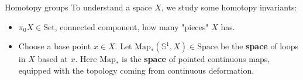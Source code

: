 \documentclass[12pt]{beamer}
\begin{document}
\begin{frame}{Homotopy groups}
To understand a space $X$, we study some homotopy invariants:
\pause
\begin{itemize}
  \item $\pi_0 X \in \mathrm{Set} $, connected component, how many "pieces" $X$ has. 
    \pause
  \item Choose a base point $x\in X$. Let $\mathrm{Map}_*(\mathbb{S}^1,X)\in \mathrm{Space}$ be the \textbf{space} of loops in $X$ based at $x$. Here $\mathrm{Map}_*$ is the \textbf{space} of pointed continuous maps, equipped with the topology coming from continuous deformation. 
\end{itemize}
\end{frame}
\end{document}
